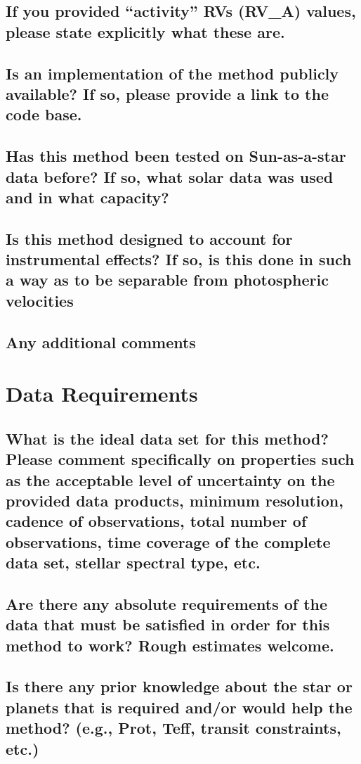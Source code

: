 \documentclass[12pt]{article}
\numberwithin{equation}{section}
\begin{document}
\subsection{If you provided ``activity'' RVs (RV\_A) values, please state explicitly what these are.}

\subsection{Is an implementation of the method publicly available? If so, please provide a link to the code base.}

\subsection{Has this method been tested on Sun-as-a-star data before? If so, what solar data was used and in what capacity?}

\subsection{Is this method designed to account for instrumental effects? If so, is this done in such a way as to be separable from photospheric velocities}

\subsection{Any additional comments}


\section{Data Requirements}
\subsection{What is the ideal data set for this method?  Please comment specifically on properties such as the acceptable level of uncertainty on the provided data products, minimum resolution, cadence of observations, total number of observations, time coverage of the complete data set, stellar spectral type, etc.}

\subsection{Are there any absolute requirements of the data that must be satisfied in order for this method to work?  Rough estimates welcome.}

\subsection{Is there any prior knowledge about the star or planets that is required and/or would help the method? (e.g., Prot, Teff, transit constraints, etc.)}
\end{document}
